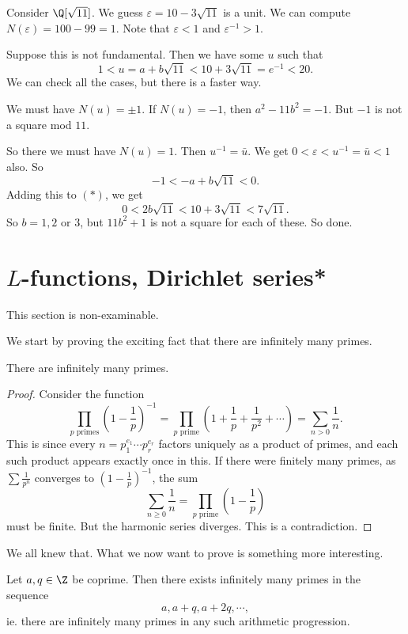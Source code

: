 \documentclass[a4paper]{article}
\begin{document}
\begin{eg}
  Consider $\Q[\sqrt{11}]$. We guess $\varepsilon = 10 - 3\sqrt{11}$ is a unit. We can compute $N(\varepsilon) = 100 - 99 = 1$. Note that $\varepsilon < 1$ and $\varepsilon^{-1} > 1$.

  Suppose this is not fundamental. Then we have some $u$ such that
  \[
    1 < u = a + b\sqrt{11} < 10 + 3\sqrt{11} = e^{-1} < 20.\tag{$*$}
  \]
  We can check all the cases, but there is a faster way.

  We must have $N(u) = \pm 1$. If $N(u) = -1$, then $a^2 - 11b^2 = -1$. But $-1$ is not a square mod $11$.

  So there we must have $N(u) = 1$. Then $u^{-1} = \bar{u}$. We get $0 < \varepsilon < u^{-1} = \bar{u} < 1$ also. So
  \[
    -1 < -a + b\sqrt{11} < 0.
  \]
  Adding this to $(*)$, we get
  \[
    0 < 2b\sqrt{11} < 10 + 3\sqrt{11} < 7\sqrt{11}.
  \]
  So $b = 1, 2$ or $3$, but $11b^2 + 1$ is not a square for each of these. So done.
\end{eg}

\section{\texorpdfstring{$L$}{L}-functions, Dirichlet series*}
This section is non-examinable.

We start by proving the exciting fact that there are infinitely many primes.
\begin{thm}[Euclid]
  There are infinitely many primes.
\end{thm}

\begin{proof}
  Consider the function
  \[
    \prod_{p\text{ primes}} \left(1 - \frac{1}{p}\right)^{-1} = \prod_{p\text{ prime}}\left(1 + \frac{1}{p} + \frac{1}{p^2} + \cdots\right) = \sum_{n > 0}\frac{1}{n}.
  \]
  This is since every $n = p_1^{e_1} \cdots p_r^{e_r}$ factors uniquely as a product of primes, and each such product appears exactly once in this. If there were finitely many primes, as $\sum \frac{1}{p^n}$ converges to $\left(1 - \frac{1}{p}\right)^{-1}$, the sum
  \[
    \sum_{n \geq 0}\frac{1}{n} = \prod_{p\text{ prime}} \left(1 - \frac{1}{p}\right)
  \]
  must be finite. But the harmonic series diverges. This is a contradiction.
\end{proof}

We all knew that. What we now want to prove is something more interesting.
\begin{thm}
  Let $a, q \in \Z$ be coprime. Then there exists infinitely many primes in the sequence
  \[
    a, a + q, a + 2q, \cdots,
  \]
  ie. there are infinitely many primes in any such arithmetic progression.
\end{thm}
\end{document}
